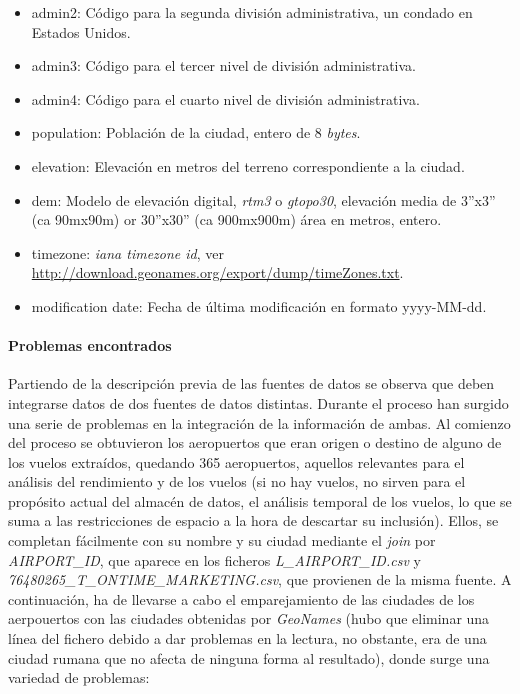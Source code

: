\documentclass{article}
\begin{document}
\begin{itemize}
\begin{itemize}
            \item admin2: Código para la segunda división administrativa, un condado en Estados Unidos.
            \item admin3: Código para el tercer nivel de división administrativa.
            \item admin4: Código para el cuarto nivel de división administrativa.
            \item population: Población de la ciudad, entero de 8 \textit{bytes}.
            \item elevation: Elevación en metros del terreno correspondiente a la ciudad.
            \item dem: Modelo de elevación digital, \textit{rtm3} o \textit{gtopo30}, elevación media de 3''x3'' (ca 90mx90m) or 30''x30'' (ca 900mx900m) área en metros, entero.
            \item timezone: \textit{iana timezone id}, ver \url{http://download.geonames.org/export/dump/timeZones.txt}.
            \item modification date: Fecha de última modificación en formato yyyy-MM-dd.
        \end{itemize}
    
\end{itemize}


\newpage
\paragraph{Problemas encontrados\\\newline}
Partiendo de la descripción previa de las fuentes de datos se observa que deben integrarse datos de dos fuentes de datos distintas. Durante el proceso han surgido una serie de problemas en la integración de la información de ambas. Al comienzo del proceso se obtuvieron los aeropuertos que eran origen o destino de alguno de los vuelos extraídos, quedando 365 aeropuertos, aquellos relevantes para el análisis del rendimiento y de los vuelos (si no hay vuelos, no sirven para el propósito actual del almacén de datos, el análisis temporal de los vuelos, lo que se suma a las restricciones de espacio a la hora de descartar su inclusión). Ellos, se completan fácilmente con su nombre y su ciudad mediante el \textit{join} por \textit{AIRPORT\_ID}, que aparece en los ficheros \textit{L\_AIRPORT\_ID.csv} y \textit{76480265\_T\_ONTIME\_MARKETING.csv}, que provienen de la misma fuente. A continuación, ha de llevarse a cabo el emparejamiento de las ciudades de los aerpouertos con las ciudades obtenidas por \textit{GeoNames} (hubo que eliminar una línea del fichero debido a dar problemas en la lectura, no obstante, era de una ciudad rumana que no afecta de ninguna forma al resultado), donde surge una variedad de problemas:
\end{document}
